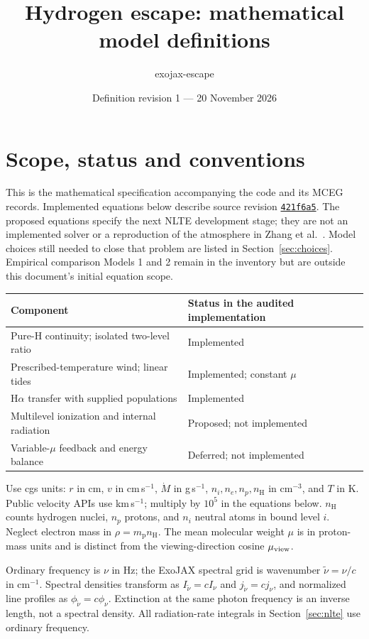 \documentclass[11pt,a4paper]{article}
\title{Hydrogen escape: mathematical model definitions}
\author{exojax-escape}
\date{Definition revision 1 --- 20 November 2026}
\newcommand{\nH}{n_{\mathrm H}}
\newcommand{\mpart}{m_{\mathrm p}}
\newcommand{\wn}{\tilde\nu}
\begin{document}
\maketitle

\section{Scope, status and conventions}\label{sec:scope}
This is the mathematical specification accompanying the code and its MCEG
records. Implemented equations below describe source revision
\href{https://github.com/HajimeKawahara/exojax-escape/tree/421f6a532ced0d0c5614124c4fea902070f93174}{\texttt{421f6a5}}.
The proposed equations specify the next NLTE development stage; they are not
an implemented solver or a reproduction of the atmosphere in Zhang et
al.~\cite{zhang}. Model choices still needed to close that problem are listed
in Section~\ref{sec:choices}. Empirical comparison Models 1 and 2 remain in the
inventory but are outside this document's initial equation scope.

\begin{center}
\begin{tabular}{@{}ll@{}}
\toprule
Component & Status in the audited implementation \\
\midrule
Pure-H continuity; isolated two-level ratio & Implemented \\
Prescribed-temperature wind; linear tides & Implemented; constant $\mu$ \\
H$\alpha$ transfer with supplied populations & Implemented \\
Multilevel ionization and internal radiation & Proposed; not implemented \\
Variable-$\mu$ feedback and energy balance & Deferred; not implemented \\
\bottomrule
\end{tabular}
\end{center}

Use cgs units: $r$ in cm, $v$ in cm\,s$^{-1}$, $\dot M$ in g\,s$^{-1}$,
$n_i,n_e,n_p,\nH$ in cm$^{-3}$, and $T$ in K. Public velocity APIs use
km\,s$^{-1}$; multiply by $10^5$ in the equations below. $\nH$ counts hydrogen
nuclei, $n_p$ protons, and $n_i$ neutral atoms in bound level $i$.
Neglect electron mass in $\rho=\mpart\nH$.
The mean molecular weight $\mu$ is in proton-mass units and is distinct from
the viewing-direction cosine $\mu_{\rm view}$.

Ordinary frequency is $\nu$ in Hz; the ExoJAX spectral grid is wavenumber
$\wn=\nu/c$ in cm$^{-1}$. Spectral densities transform as
$I_{\wn}=cI_\nu$ and $j_{\wn}=cj_\nu$, and normalized line profiles as
$\phi_{\wn}=c\phi_\nu$. Extinction at the same photon frequency is an inverse
length, not a spectral density. All radiation-rate integrals in
Section~\ref{sec:nlte} use ordinary frequency.
\end{document}
